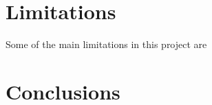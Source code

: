 \documentclass[paper=a4, fontsize=11pt]{scrartcl}
\numberwithin{equation}{section}
\numberwithin{figure}{section}
\numberwithin{table}{section}
\begin{document}


\section{Limitations}
Some of the main limitations in this project are 


\section{Conclusions}


	
\end{document}
